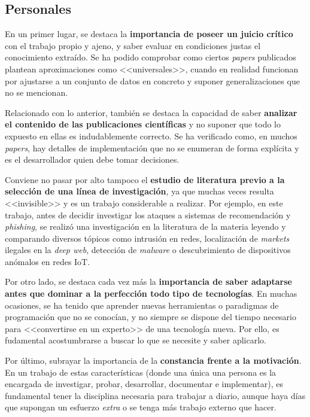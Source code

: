 \subsection{Personales}

En un primer lugar, se destaca la \textbf{importancia de poseer un juicio crítico} con el trabajo propio y ajeno, y saber evaluar en condiciones justas el conocimiento extraído. Se ha podido comprobar como ciertos \textit{papers} publicados plantean aproximaciones como <<universales>>, cuando en realidad funcionan por ajustarse a un conjunto de datos en concreto y suponer generalizaciones que no se mencionan.

Relacionado con lo anterior, también se destaca la capacidad de saber \textbf{analizar el contenido de las publicaciones científicas} y no suponer que todo lo expuesto en ellas es indudablemente correcto. Se ha verificado como, en muchos \textit{papers}, hay detalles de implementación que no se enumeran de forma explícita y es el desarrollador quien debe tomar decisiones.

Conviene no pasar por alto tampoco el \textbf{estudio de literatura previo a la selección de una línea de investigación}, ya que muchas veces resulta <<invisible>> y es un trabajo considerable a realizar. Por ejemplo, en este trabajo, antes de decidir investigar los ataques a sistemas de recomendación y \textit{phishing}, se realizó una investigación en la literatura de la materia leyendo y comparando diversos tópicos como intrusión en redes, localización de \textit{markets} ilegales en la \textit{deep web}, detección de \textit{malware} o descubrimiento de dispositivos anómalos en redes IoT.

Por otro lado, se destaca cada vez más la \textbf{importancia de saber adaptarse antes que dominar a la perfección todo tipo de tecnologías}. En muchas ocasiones, se ha tenido que aprender nuevas herramientas o paradigmas de programación que no se conocían, y no siempre se dispone del tiempo necesario para <<convertirse en un experto>> de una tecnología nueva. Por ello, es fudamental acostumbrarse a buscar lo que se necesite y saber aplicarlo.

Por último, subrayar la importancia de la \textbf{constancia frente a la motivación}. En un trabajo de estas características (donde una única una persona es la encargada de investigar, probar, desarrollar, documentar e implementar), es fundamental tener la disciplina necesaria para trabajar a diario, aunque haya días que supongan un esfuerzo \textit{extra} o se tenga más trabajo externo que hacer.


